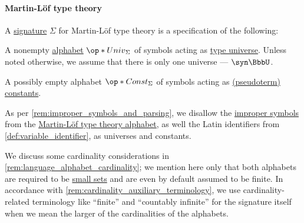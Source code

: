 \paragraph{Martin-L\"of type theory}

\begin{definition}\label{def:mltt_signature}\mimprovised
  A \hyperref[con:logical_system_signature]{signature} \( \Sigma \) for Martin-L\"of type theory is a specification of the following:
  \begin{thmenum}
     A nonempty \hyperref[def:formal_language/alphabet]{alphabet} \( \op*{Univ}_\Sigma \) of symbols acting as \hyperref[con:type_universe]{type universe}. Unless noted otherwise, we assume that there is only one universe --- \( \syn\BbbU \).

     A possibly empty alphabet \( \op*{Const}_\Sigma \) of symbols acting as \hyperref[def:mltt_pseudoterm]{(pseudoterm) constants}.
  \end{thmenum}

  As per \cref{rem:improper_symbols_and_parsing}, we disallow the \hyperref[con:improper_symbol]{improper symbols} from the \hyperref[def:mltt_alphabet]{Martin-L\"of type theory alphabet}, as well the Latin identifiers from \cref{def:variable_identifier}, as universes and constants.
\end{definition}
\begin{comments}
  \item We discuss some cardinality considerations in \cref{rem:language_alphabet_cardinality}; we mention here only that both alphabets are required to be \hyperref[def:small_set]{small sets} and are even by default assumed to be finite. In accordance with \cref{rem:cardinality_auxiliary_terminology}, we use cardinality-related terminology like \enquote{finite} and \enquote{countably infinite} for the signature itself when we mean the larger of the cardinalities of the alphabets.
\end{comments}

